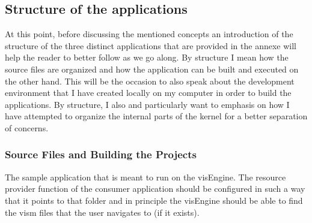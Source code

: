 \subsection{Structure of the applications}

At this point, before discussing the mentioned concepts an introduction of the structure of the three distinct applications that are provided in the annexe will help the reader to better follow as we go along. By structure I mean how the source files are organized and how the application can be built and executed on the other hand. This will be the occasion to also speak about the development environment that I have created locally on my computer in order to build the applications. By structure, I also and particularly want to emphasis on how I have attempted to organize the internal parts of the kernel for a better separation of concerns.

\subsubsection{Source Files and Building the Projects}

The sample application that is meant to run on the visEngine. The resource provider function of the consumer application should be configured in such a way that it points to that folder and in principle the visEngine should be able to find the vism files that the user navigates to (if it exists).